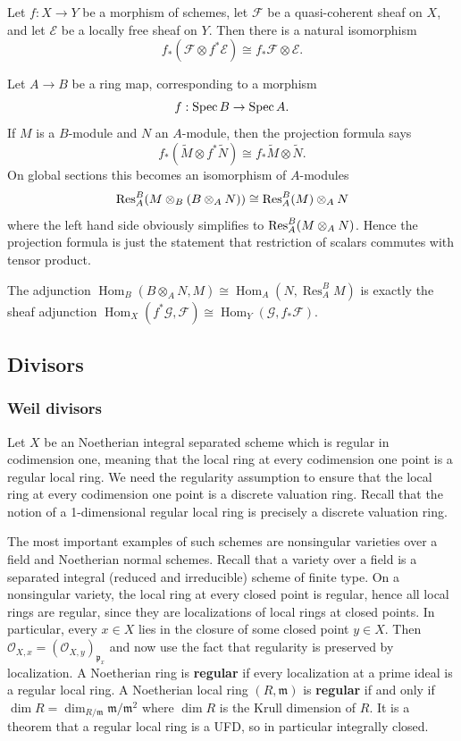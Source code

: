 \documentclass[12pt]{article}
\begin{document}
\begin{theorem}
    Let \(f:X\to Y\) be a morphism of schemes, let \(\mathcal F\) be a quasi-coherent sheaf on \(X\), and let \(\mathcal E\) be a locally free sheaf on \(Y\). Then there is a natural isomorphism
    \[
        f_*(\mathcal F\otimes f^*\mathcal E)\cong f_*\mathcal F\otimes \mathcal E.
    \]
\end{theorem}

\begin{example}
    Let \(A\to B\) be a ring map, corresponding to a morphism
    \[
        f:\operatorname{Spec} B\to \operatorname{Spec} A.
    \]
    If \(M\) is a \(B\)-module and \(N\) an \(A\)-module, then the projection formula says
    \[
        f_*(\widetilde M\otimes f^*\widetilde N)\cong f_*\widetilde M\otimes \widetilde N.
    \]
    On global sections this becomes an isomorphism of \(A\)-modules
    \[
        \operatorname{Res}_A^B (M\otimes_B (B\otimes_A N)) \cong \operatorname{Res}_A^B(M)\otimes_A N
    \]
    where the left hand side obviously simplifies to \(\operatorname{Res}_A^B(M \otimes_A N)\). Hence the projection formula is just the statement that restriction of scalars commutes with tensor product.
\end{example}
The adjunction $\operatorname{Hom}_B(B\otimes_A N,M) \cong \operatorname{Hom}_A(N,\operatorname{Res}_A^B M)$ is exactly the sheaf adjunction $\operatorname{Hom}_X(f^*\mathcal G,\mathcal F)
\cong
\operatorname{Hom}_Y(\mathcal G,f_*\mathcal F)$.


\subsection{Divisors}
\subsubsection{Weil divisors}
Let $X$ be an Noetherian integral separated scheme which is regular in
codimension one, meaning that the local ring at every codimension one point is a regular local ring. We need the regularity assumption to ensure that the local ring at every codimension one point is a discrete valuation ring. Recall that the notion of a 1-dimensional regular local ring is precisely a discrete valuation ring.

The most important examples of such schemes are nonsingular varieties over a field and Noetherian normal schemes. Recall that a variety over a field is a separated integral (reduced and irreducible) scheme of finite type. On a nonsingular variety, the local ring at every closed point is regular, hence all local rings are regular, since they are localizations of local rings at closed points. In particular,
every $x \in X$ lies in the closure of some closed point $y \in X$. Then $\mathcal O_{X,x} = (\mathcal O_{X,y})_{\mathfrak p_x}$ and now use the fact that regularity is preserved by localization.
A Noetherian ring is \textbf{regular} if every localization at a prime ideal is a regular local ring. A Noetherian local ring $(R, \mathfrak{m})$ is \textbf{regular} if and only if $\dim R = \dim_{R/\mathfrak{m}} \mathfrak{m}/\mathfrak{m}^2$ where $\dim R$ is the Krull dimension of $R$. It is a theorem that a regular local ring is a UFD, so in particular integrally closed.
\end{document}
